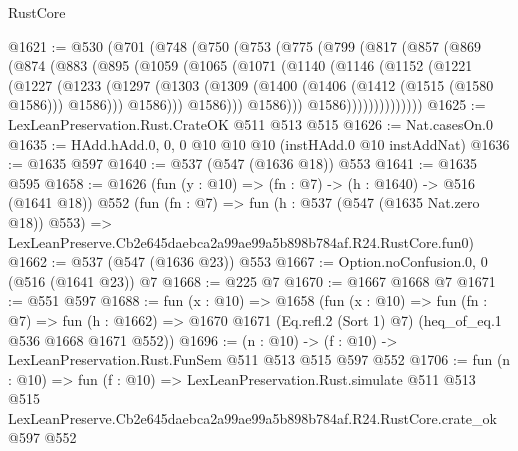 \begin{lexlean}{RustCore}
\begin{coremodule}
@1621 := @530
    (@701
      (@748
        (@750
          (@753
            (@775
              (@799
                (@817
                  (@857
                    (@869
                      (@874
                        (@883
                          (@895
                            (@1059
                              (@1065
                                (@1071
                                  (@1140
                                    (@1146
                                      (@1152
                                        (@1221
                                          (@1227
                                            (@1233
                                              (@1297
                                                (@1303
                                                  (@1309
                                                    (@1400
                                                      (@1406 (@1412 (@1515 (@1580 @1586))) @1586)))
                                                  @1586)))
                                            @1586)))
                                      @1586)))
                                @1586))))))))))))))
@1625 := LexLeanPreservation.Rust.CrateOK @511 @513 @515
@1626 := Nat.casesOn.{0}
@1635 := HAdd.hAdd.{0, 0, 0} @10 @10 @10 (instHAdd.{0} @10 instAddNat)
@1636 := @1635 @597
@1640 := @537 (@547 (@1636 @18)) @553
@1641 := @1635 @595
@1658 := @1626
    (fun (y : @10) => (fn : @7) -> (h : @1640) -> @516 (@1641 @18))
    @552
    (fun (fn : @7) =>
    fun (h : @537 (@547 (@1635 Nat.zero @18)) @553) =>
    LexLeanPreserve.Cb2e645daebca2a99ae99a5b898b784af.R24.RustCore.fun0)
@1662 := @537 (@547 (@1636 @23)) @553
@1667 := Option.noConfusion.{0, 0} (@516 (@1641 @23)) @7
@1668 := @225 @7
@1670 := @1667 @1668 @7
@1671 := @551 @597
@1688 := fun (x : @10) =>
  @1658
    (fun (x : @10) =>
    fun (fn : @7) =>
    fun (h : @1662) => @1670 @1671 (Eq.refl.{2} (Sort 1) @7) (heq_of_eq.{1} @536 @1668 @1671 @552))
@1696 := (n : @10) -> (f : @10) -> LexLeanPreservation.Rust.FunSem @511 @513 @515 @597 @552
@1706 := fun (n : @10) =>
  fun (f : @10) =>
  LexLeanPreservation.Rust.simulate
    @511
    @513
    @515
    LexLeanPreserve.Cb2e645daebca2a99ae99a5b898b784af.R24.RustCore.crate_ok
    @597
    @552
\end{coremodule}
\end{lexlean}
